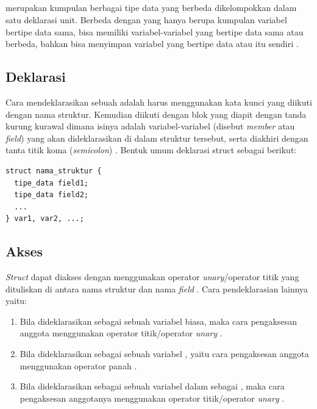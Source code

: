 \documentclass[../main.tex]{subfiles}
\begin{document}
\subsection{{\Struct}}

{\Struct} merupakan kumpulan berbagai tipe data yang berbeda dikelompokkan dalam satu deklarasi unit. Berbeda dengan {\sarray} yang hanya berupa kumpulan variabel bertipe data sama, {\struct} bisa memiliki variabel-variabel yang bertipe data sama atau berbeda, bahkan bisa menyimpan variabel yang bertipe data {\sarray} atau {\struct}  itu sendiri \parencite{Bachtiar_2005}.

\subsection{Deklarasi {\Struct}}

Cara mendeklarasikan sebuah {\struct} adalah harus menggunakan kata kunci  yang diikuti dengan nama struktur. Kemudian diikuti dengan blok yang diapit dengan tanda kurung kurawal \citecode{\{\}} dimana isinya adalah variabel-variabel (disebut \textit{member} atau \textit{field}) yang akan dideklarasikan di dalam struktur tersebut, serta diakhiri dengan tanta titik koma (\textit{semicolon}) \parencite{utami10}. Bentuk umum deklarasi struct sebagai berikut:

\begin{code}
\begin{verbatim}
struct nama_struktur {
  tipe_data field1;
  tipe_data field2;
  ...
} var1, var2, ...;
\end{verbatim}
\end{code}

\subsection{Akses {\Struct}}

\textit{Struct} dapat diakses dengan menggunakan operator \textit{unary}/operator titik  yang dituliskan di antara nama struktur dan nama \textit{field} \parencite{utami10}. Cara pendeklarasian lainnya yaitu:

\begin{enumerate}
    \item Bila {\struct} dideklarasikan sebagai sebuah variabel biasa, maka cara pengaksesan anggota {\struct} menggunakan operator titik/operator \textit{unary} .
    \item Bila {\struct} dideklarasikan sebagai sebuah variabel {\pointer}, yaitu cara pengaksesan anggota {\struct} menggunakan operator panah .
    \item Bila {\struct} dideklarasikan sebagai sebuah variabel dalam {\pointer} sebagai {\sarray}, maka cara pengaksesan anggotanya {\struct} menggunakan operator titik/operator \textit{unary} .
\end{enumerate}
\end{document}
